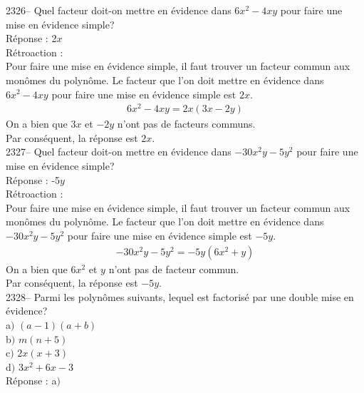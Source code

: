 \documentclass[letterpaper, 12pt]{article}
\begin{document}
2326-- Quel facteur doit-on mettre en \'evidence dans $6x^{2}-4xy$ pour faire une mise en \'evidence simple?\\

R\'eponse : 2$x$\\

R\'etroaction :\\
Pour faire une mise en \'evidence simple, il faut trouver un facteur commun aux mon\^omes du polyn\^ome. Le facteur que l'on doit mettre en \'evidence dans $6x^{2}-4xy$ pour faire une mise en \'evidence simple est $2x$.
\begin{eqnarray*}
 6x^{2}-4xy=2x(3x-2y)
\end{eqnarray*}
On a bien que $3x$ et $-2y$ n'ont pas de facteurs communs.\\
Par cons\'equent, la r\'eponse est $2x$.\\

2327-- Quel facteur doit-on mettre en \'evidence dans $-30x^{2}y-5y^{2}$ pour faire une mise en \'evidence simple?\\

R\'eponse : -5$y$\\

R\'etroaction :\\
Pour faire une mise en \'evidence simple, il faut trouver un facteur commun aux mon\^omes du polyn\^ome. Le facteur que l'on doit mettre en \'evidence dans $-30x^{2}y-5y^{2}$ pour faire une mise en \'evidence simple est $-5y$.
\begin{eqnarray*}
 -30x^{2}y-5y^{2}=-5y(6x^{2}+y)
\end{eqnarray*}
On a bien que $6x^{2}$ et $y$ n'ont pas de facteur commun.\\
Par cons\'equent, la r\'eponse est $-5y$.\\

2328-- Parmi les polyn\^omes suivants, lequel est factoris\'e par une double mise en \'evidence?\\

a$)$ $(a-1)(a+b)$\\
b$)$ $m(n+5) $\\
c$)$ $2x(x+3)$\\
d$)$ $3x^{2}+6x-3$\\

R\'eponse : a$)$\\
\end{document}
